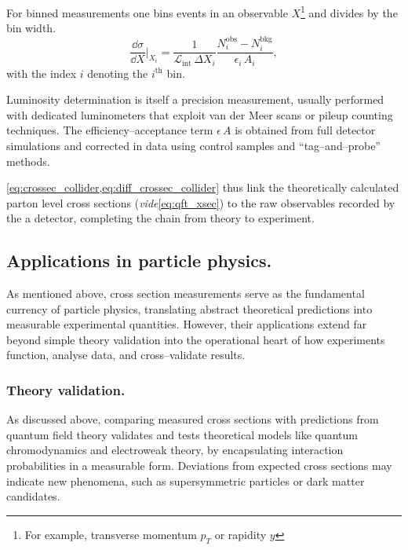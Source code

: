 \begin{definition}
        For binned measurements one bins events in an observable \(X\)\footnote{For example, transverse momentum \(p_T\) or rapidity \(y\)} and divides by the bin width.
        \begin{equation}
          \frac{\dd\sigma}{\dd X}\Big|_{X_i}
          = \frac{1}{\mathcal{L}_{\text{int}}\,\Delta X_i}
            \frac{N_i^{\text{obs}} - N_i^{\text{bkg}}}
                 {\epsilon_i\,A_i},
          \label{eq:diff_crossec_collider}
        \end{equation}
        with the index \(i\) denoting the \(i^{\text{th}}\) bin.

        Luminosity determination is itself a precision measurement, usually performed with dedicated luminometers that exploit van der Meer scans or pileup counting techniques.
        The efficiency--acceptance term \(\epsilon\,A\) is obtained from full detector simulations and corrected in data using control samples and ``tag--and--probe'' methods.

        \cref{eq:crossec_collider,eq:diff_crossec_collider} thus link the theoretically calculated parton level cross sections (\textit{vide}\cref{eq:qft_xsec}) to the raw observables recorded by the a detector, completing the chain from theory to experiment.

    \subsection{Applications in particle physics.}
        As mentioned above, cross section measurements serve as the fundamental currency of particle physics, translating abstract theoretical predictions into measurable experimental quantities.
        However, their applications extend far beyond simple theory validation into the operational heart of how experiments function, analyse data, and cross--validate results.
        \subsubsection{Theory validation.}
            As discussed above, comparing measured cross sections with predictions from quantum field theory validates and tests theoretical models like quantum chromodynamics and electroweak theory, by encapsulating interaction probabilities in a measurable form.
            Deviations from expected cross sections may indicate new phenomena, such as supersymmetric particles or dark matter candidates.
            

\end{definition}
